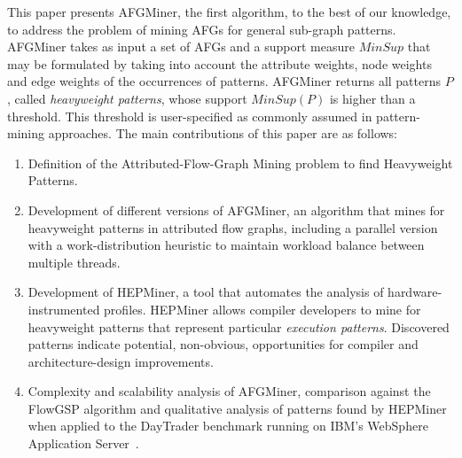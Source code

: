 This paper presents AFGMiner, the first algorithm, to the best of our knowledge, to address the problem of mining AFGs for general sub-graph patterns. AFGMiner takes as input a set of AFGs and a support measure $MinSup$ that may be formulated by taking into account the attribute weights, node weights and edge weights of the occurrences of patterns. AFGMiner returns all patterns $P$, called \emph{heavyweight patterns}, whose support $MinSup(P)$ is higher than a threshold. This threshold is user-specified as commonly assumed in pattern-mining approaches.
The main contributions of this paper are as follows: 

\begin{enumerate}
\item Definition of the Attributed-Flow-Graph Mining problem to find Heavyweight Patterns.

\item Development of different versions of AFGMiner, an algorithm that mines for heavyweight patterns in attributed flow graphs, including a parallel version with a work-distribution heuristic to maintain workload balance between multiple threads.

\item Development of HEPMiner, a tool that automates the analysis of hardware-instrumented profiles. HEPMiner allows compiler developers to mine for heavyweight patterns that represent particular \emph{execution patterns}. Discovered patterns indicate potential, non-obvious, opportunities for compiler and architecture-design improvements.

\item Complexity and scalability analysis of AFGMiner, comparison against the FlowGSP algorithm and qualitative analysis of patterns found by HEPMiner when applied to the DayTrader benchmark running on IBM's WebSphere Application Server~\cite{WAS}.
\end{enumerate} 





